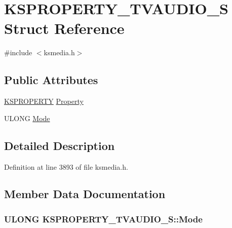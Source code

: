 \hypertarget{struct_k_s_p_r_o_p_e_r_t_y___t_v_a_u_d_i_o___s}{}\section{K\+S\+P\+R\+O\+P\+E\+R\+T\+Y\+\_\+\+T\+V\+A\+U\+D\+I\+O\+\_\+S Struct Reference}
\label{struct_k_s_p_r_o_p_e_r_t_y___t_v_a_u_d_i_o___s}


{\ttfamily \#include $<$ksmedia.\+h$>$}

\subsection*{Public Attributes}
\begin{DoxyCompactItemize}
\item 
\hyperlink{ks_8h_a4392f77c74e868d813d46c39ada4d660}{K\+S\+P\+R\+O\+P\+E\+R\+TY} \hyperlink{struct_k_s_p_r_o_p_e_r_t_y___t_v_a_u_d_i_o___s_a2d90a22cf09c4526636f837b7cc46e68}{Property}
\item 
U\+L\+O\+NG \hyperlink{struct_k_s_p_r_o_p_e_r_t_y___t_v_a_u_d_i_o___s_a381e98e2a848bf02cef960390720b015}{Mode}
\end{DoxyCompactItemize}


\subsection{Detailed Description}


Definition at line 3893 of file ksmedia.\+h.



\subsection{Member Data Documentation}
\subsubsection[{\texorpdfstring{Mode}{Mode}}]{\setlength{\rightskip}{0pt plus 5cm}U\+L\+O\+NG K\+S\+P\+R\+O\+P\+E\+R\+T\+Y\+\_\+\+T\+V\+A\+U\+D\+I\+O\+\_\+\+S\+::\+Mode}\hypertarget{struct_k_s_p_r_o_p_e_r_t_y___t_v_a_u_d_i_o___s_a381e98e2a848bf02cef960390720b015}{}\label{struct_k_s_p_r_o_p_e_r_t_y___t_v_a_u_d_i_o___s_a381e98e2a848bf02cef960390720b015}


